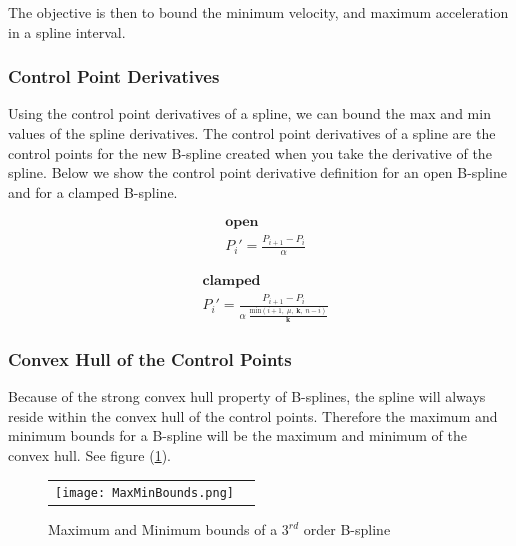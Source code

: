 \documentclass{article}
\begin{document}
The objective is then to bound the minimum velocity, and maximum acceleration in a spline interval.

\subsubsection{Control Point Derivatives}

Using the control point derivatives of a spline, we can bound the max and min values of the spline derivatives. The control point derivatives of a spline are the control points for the new B-spline created when you take the derivative of the spline. Below we show the control point derivative definition for an open B-spline and for a clamped B-spline.

\begin{equation}
\begin{aligned}
    & \textbf{open} \\
    & P_i' = \frac{P_{i+1} - P_{i}}{\alpha}
\end{aligned}
\end{equation}

\begin{equation}
\begin{aligned}
    & \textbf{clamped} \\
    & P_i' = \frac{ P_{i+1} - P_i}{\alpha \; \frac{\text{min}(i+1,\;\mu,\;\textbf{k},\; n-i)}{\textbf{k}}}
\end{aligned}
\end{equation}

\subsubsection{Convex Hull of the Control Points}

Because of the strong convex hull property of B-splines, the spline will always reside within the convex hull of the control points. Therefore the maximum and minimum bounds for a B-spline will be the maximum and minimum of the convex hull. See figure (\ref{Fig:MaxMinBounds}).

\begin{figure}[H]
\begin{tabular}{ll}
\texttt{[image: MaxMinBounds.png]}
\end{tabular}
\caption{Maximum and Minimum bounds of a \(3^{rd}\) order B-spline}
\label{Fig:MaxMinBounds}
\end{figure}

\hspace{1cm}
\end{document}

